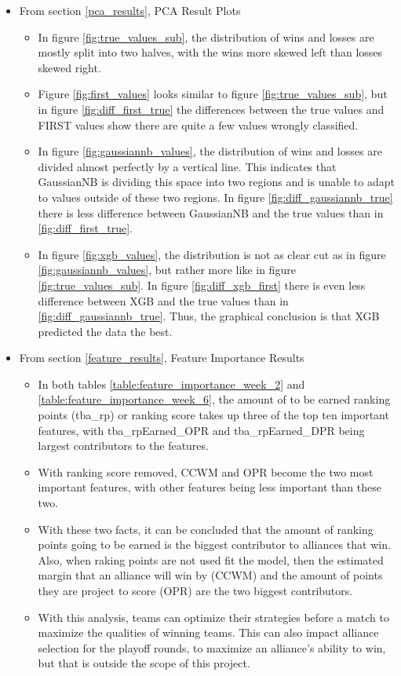 \documentclass{article}
\begin{document}
\begin{itemize}
    \item From section \ref{pca_results}, PCA Result Plots
    \begin{itemize}
        \item In figure \ref{fig:true_values_sub}, the distribution of wins and losses are mostly split into two halves, with the wins more skewed left than losses skewed right.
        \item Figure \ref{fig:first_values} looks similar to figure \ref{fig:true_values_sub}, but in figure \ref{fig:diff_first_true} the differences between the true values and FIRST values show there are quite a few values wrongly classified.
        \item In figure \ref{fig:gaussiannb_values}, the distribution of wins and losses are divided almost perfectly by a vertical line. This indicates that GaussianNB is dividing this space into two regions and is unable to adapt to values outside of these two regions. In figure \ref{fig:diff_gaussiannb_true} there is less difference between GaussianNB and the true values than in \ref{fig:diff_first_true}.
        \item In figure \ref{fig:xgb_values}, the distribution is not as clear cut as in figure \ref{fig:gaussiannb_values}, but rather more like in figure \ref{fig:true_values_sub}. In figure \ref{fig:diff_xgb_first} there is even less difference between XGB and the true values than in \ref{fig:diff_gaussiannb_true}. Thus, the graphical conclusion is that XGB predicted the data the best.
    \end{itemize}
    \item From section \ref{feature_results}, Feature Importance Results
    \begin{itemize}
        \item In both tables \ref{table:feature_importance_week_2} and \ref{table:feature_importance_week_6}, the amount of to be earned ranking points (tba\_rp) or ranking score takes up three of the top ten important features, with tba\_rpEarned\_OPR and tba\_rpEarned\_DPR being largest contributors to the features.
        \item With ranking score removed, CCWM and OPR become the two most important features, with other features being less important than these two.
        \item With these two facts, it can be concluded that the amount of ranking points going to be earned is the biggest contributor to alliances that win. Also, when raking points are not used fit the model, then the estimated margin that an alliance will win by (CCWM) and the amount of points they are project to score (OPR) are the two biggest contributors.
        \item With this analysis, teams can optimize their strategies before a match to maximize the qualities of winning teams. This can also impact alliance selection for the playoff rounds, to maximize an alliance's ability to win, but that is outside the scope of this project.
    \end{itemize}
\end{itemize}
\end{document}
